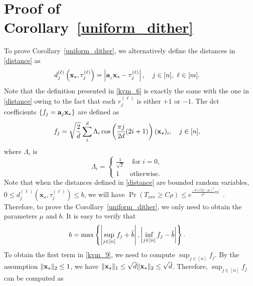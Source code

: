\documentclass[12pt,draftcls,onecolumn]{IEEEtran}
\def\bt{\Tilde{b}}
\newcommand{\Ae}[1]{\textcolor{red}{#1}}
\begin{document}
\section{Proof of Corollary~\ref{uniform_dither}}
\label{kvm_5}
To prove Corollary~\ref{uniform_dither}, we alternatively define the distances in \eqref{distance} as
\begin{equation}
\label{kvm_6}
d^{(\ell)}_{j}\left(\mathbf{x}_{\star},\tau_{j}^{(\ell)}\right)=\left|\mba_{_{j}}\mathbf{x}_{\star}-\tau^{(\ell)}_{j}\right|,\quad j\in [n],~ \ell\in[m].
\end{equation}
Note that the definition presented in \eqref{kvm_6} is exactly the same with the one in \eqref{distance} owing to the fact that each $r_{j}^{(\ell)}$ is either $+1$ or $-1$. The dct coefficients $\{f_j=\mathbf{a}_j\mathbf{x}_{\star}\}$ are defined as
\begin{equation}
\label{kvm_7}
f_j=\sqrt{\frac{2}{d}}\sum_{i}^{d}\Lambda_{i}\cos\left(\frac{\pi j}{2 d}(2 i+1)\right) (\mbx_{\star})_{i},\quad j\in[n],
\end{equation}
where $\Lambda_i$ is
\begin{equation}
\label{kvm_8}
\Lambda_i=\left\{\begin{array}{cl}
\frac{1}{\sqrt{2}} & \text { for } i=0,\\
1 & \text {otherwise.}
\end{array}\right.
\end{equation}
Note that when the distances defined in \eqref{distance} are bounded random variables, $0\leq d^{(\ell)}_{j}\left(\mathbf{x}_{\star},\tau^{(\ell)}_{j}\right)\leq b$, we will have $\operatorname{Pr}\left(T_{\mathrm{ave}}\geq C \rho\right)\leq e^{\frac{-2\left(C\rho-\mu\right)^{2}}{b^2}m^{\prime}}$ \cite[Theorem~2]{hoeffding1994probability}.
Therefore, to prove the Corollary~\ref{uniform_dither}, we only need to obtain the parameters $\mu$ and $b$. It is easy to verify that
\begin{equation}
\label{kvm_9}
b=\max\left\{\left|\sup_{j\in[n]}f_j+\bt\right|, \left|\inf_{j\in[n]}f_j-\bt\right|\right\}.
\end{equation}
To obtain the first term in \eqref{kvm_9}, we need to compute $\sup_{j\in[n]}f_j$. By the assumption $\|\mathbf{x}_{\star}\|_2\leq 1$, we have $\|\mathbf{x}_{\star}\|_1\leq\sqrt{d}\|\mathbf{x}_{\star}\|_2\leq\sqrt{d}$. Therefore, $\sup_{j\in[n]}f_j$ can be computed as
\end{document}
